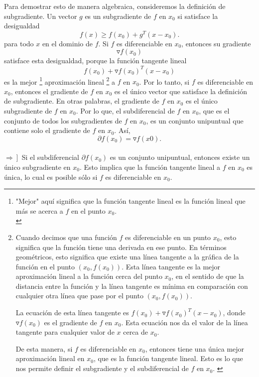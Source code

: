 \begin{enumerate}
\begin{enumerate}[\bfseries (a)]
		Para demostrar esto de manera algebraica, consideremos la definición de subgradiente. Un vector $g$ es un subgradiente de $f$ en $x_0$ si satisface la desigualdad 
		$$f(x) \geq f(x_0) + g^T (x - x_0).$$ 
		para todo $x$ en el dominio de $f$. Si $f$ es diferenciable en $x_0$, entonces su gradiente 
		$$\triangledown f(x_0)$$
		satisface esta desigualdad, porque la función tangente lineal 
		$$f(x_0) + \triangledown f(x_0)^T (x - x_0)$$ 
		es la mejor
		\footnote{
		    "Mejor" aquí significa que la función tangente lineal es la función lineal que más se acerca a $f$ en el punto $x_0$.\\
		}
		aproximación lineal
		\footnote{
		    Cuando decimos que una función $f$ es diferenciable en un punto $x_0$, esto significa que la función tiene una derivada en ese punto. En términos geométricos, esto significa que existe una línea tangente a la gráfica de la función en el punto $(x_0, f(x_0))$. Esta línea tangente es la mejor aproximación lineal a la función cerca del punto $x_0$, en el sentido de que la distancia entre la función y la línea tangente es mínima en comparación con cualquier otra línea que pase por el punto $(x_0, f(x_0))$.

		    La ecuación de esta línea tangente es $f(x_0) + \triangledown f(x_0)^T (x - x_0)$, donde $\triangledown f(x_0)$ es el gradiente de $f$ en $x_0$. Esta ecuación nos da el valor de la línea tangente para cualquier valor de $x$ cerca de $x_0$.

		    De esta manera, si $f$ es diferenciable en $x_0$, entonces tiene una única mejor aproximación lineal en $x_0$, que es la función tangente lineal. Esto es lo que nos permite definir el subgradiente y el subdiferencial de $f$ en $x_0$.
		\label{diferenciable}}
		a $f$ en $x_0$. Por lo tanto, si $f$ es diferenciable en $x_0$, entonces el gradiente de $f$ en $x_0$ es el único vector que satisface la definición de subgradiente. En otras palabras, el gradiente de $f$ en $x_0$ es el único subgradiente de $f$ en $x_0$. Por lo que, el subdiferencial de $f$ en $x_0$, que es el conjunto de todos los subgradientes de $f$ en $x_0$, es un conjunto unipuntual que contiene solo el gradiente de $f$ en $x_0$. Así, 
		$$\partial f(x_0) = {\triangledown f(x0)}.$$\\

		$\left.\Rightarrow\right]$ Si el subdiferencial $\partial f(x_0)$ es un conjunto unipuntual, entonces existe un único subgradiente en $x_0$. Esto implica que la función tangente lineal a $f$ en $x_0$ es única, lo cual es posible sólo si $f$ es diferenciable en $x_0$.


\end{enumerate}
\end{enumerate}
